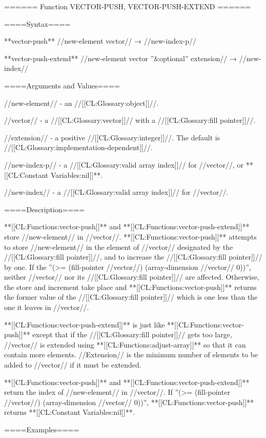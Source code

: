 ====== Function VECTOR-PUSH, VECTOR-PUSH-EXTEND ======

====Syntax====

**vector-push** //new-element vector// → //new-index-p//

**vector-push-extend** //new-element vector ''&optional'' extension// → //new-index//

====Arguments and Values====

//new-element// - an //[[CL:Glossary:object]]//.

//vector// - a //[[CL:Glossary:vector]]// with a //[[CL:Glossary:fill pointer]]//.

//extension// - a positive //[[CL:Glossary:integer]]//. The default is //[[CL:Glossary:implementation-dependent]]//.

//new-index-p// - a //[[CL:Glossary:valid array index]]// for //vector//, or **[[CL:Constant Variables:nil]]**.

//new-index// - a //[[CL:Glossary:valid array index]]// for //vector//.

====Description====

**[[CL:Functions:vector-push]]** and **[[CL:Functions:vector-push-extend]]** store //new-element// in //vector//. **[[CL:Functions:vector-push]]** attempts to store //new-element// in the element of //vector// designated by the //[[CL:Glossary:fill pointer]]//, and to increase the //[[CL:Glossary:fill pointer]]// by one. If the ''(>= (fill-pointer //vector//) (array-dimension //vector// 0))'', neither //vector// nor its //[[CL:Glossary:fill pointer]]// are affected. Otherwise, the store and increment take place and **[[CL:Functions:vector-push]]** returns the former value of the //[[CL:Glossary:fill pointer]]// which is one less than the one it leaves in //vector//.

**[[CL:Functions:vector-push-extend]]** is just like **[[CL:Functions:vector-push]]** except that if the //[[CL:Glossary:fill pointer]]// gets too large, //vector// is extended using **[[CL:Functions:adjust-array]]** so that it can contain more elements. //Extension// is the minimum number of elements to be added to //vector// if it must be extended.

**[[CL:Functions:vector-push]]** and **[[CL:Functions:vector-push-extend]]** return the index of //new-element// in //vector//. If ''(>= (fill-pointer //vector//) (array-dimension //vector// 0))'', **[[CL:Functions:vector-push]]** returns **[[CL:Constant Variables:nil]]**.

====Examples====

